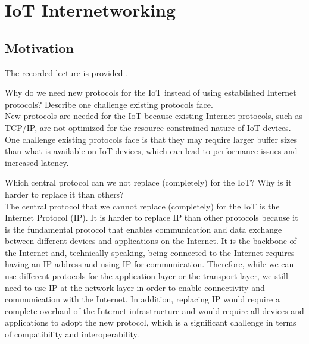 \section{IoT Internetworking}

\subsection{Motivation}

The recorded lecture is provided .

\begin{ejercicio}
    Why do we need new protocols for the IoT instead of using established Internet protocols? Describe one challenge existing protocols face.\\

    New protocols are needed for the IoT because existing Internet protocols, such as TCP/IP, are not optimized for the resource-constrained nature of IoT devices. One challenge existing protocols face is that they may require larger buffer sizes than what is available on IoT devices, which can lead to performance issues and increased latency.
\end{ejercicio}

\begin{ejercicio}
    Which central protocol can we not replace (completely) for the IoT? Why is it harder to replace it than others?\\

    The central protocol that we cannot replace (completely) for the IoT is the Internet Protocol (IP). It is harder to replace IP than other protocols because it is the fundamental protocol that enables communication and data exchange between different devices and applications on the Internet. It is the backbone of the Internet and, technically speaking, being connected to the Internet requires having an IP address and using IP for communication. Therefore, while we can use different protocols for the application layer or the transport layer, we still need to use IP at the network layer in order to enable connectivity and communication with the Internet. In addition, replacing IP would require a complete overhaul of the Internet infrastructure and would require all devices and applications to adopt the new protocol, which is a significant challenge in terms of compatibility and interoperability.
\end{ejercicio}

